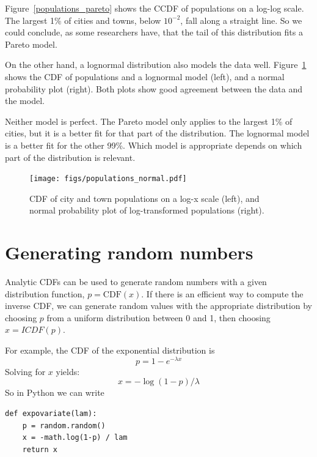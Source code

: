 \documentclass[12pt]{book}
\newcommand{\CDF}{\mathrm{CDF}}
\theoremstyle{exercise}
\begin{document}
Figure~\ref{populations_pareto} shows the CCDF of populations on a
log-log scale.  The largest 1\% of cities and towns, below $10^{-2}$,
fall along a straight line.  So we could
conclude, as some researchers have, that the tail of this distribution
fits a Pareto model.%

On the other hand, a lognormal distribution also models the data well.
Figure~\ref{populations_normal} shows the CDF of populations and a
lognormal model (left), and a normal probability plot (right).  Both
plots show good agreement between the data and the model.%

Neither model is perfect.
The Pareto model only applies to the largest 1\% of cities, but it
is a better fit for that part of the distribution.  The lognormal
model is a better fit for the other 99\%.
Which model is appropriate depends on which part of the distribution
is relevant.

\begin{figure}
\centerline{\texttt{[image: figs/populations\_normal.pdf]}}
\caption{CDF of city and town populations on a log-x scale (left), and
normal probability plot of log-transformed populations (right).}%
\label{populations_normal}
\end{figure}


\section{Generating random numbers}%
%
%
%
%
%
%

Analytic CDFs can be used to generate random numbers with a given
distribution function, $p = \CDF(x)$.  If there is an efficient way to
compute the inverse CDF, we can generate random values
with the appropriate distribution by choosing $p$ from a uniform
distribution between 0 and 1, then choosing
$x = ICDF(p)$.%
%

For example, the CDF of the exponential distribution is
%
\[ p = 1 - e^{-\lambda x} \]
%
Solving for $x$ yields:
%
\[ x = -\log (1 - p) / \lambda \]
%
So in Python we can write
%
\begin{verbatim}
def expovariate(lam):
    p = random.random()
    x = -math.log(1-p) / lam
    return x
\end{verbatim}
\end{document}
